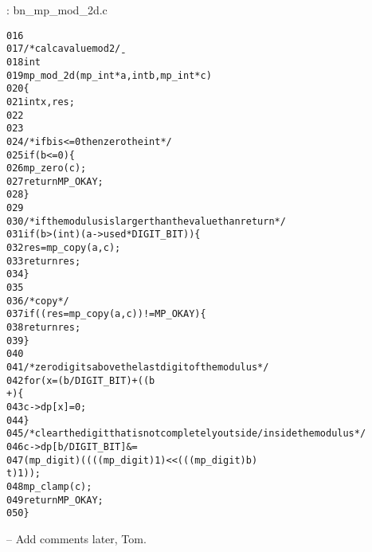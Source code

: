 \documentclass[b5paper]{book}
\begin{document}
\vspace{+3mm}\begin{small}
\hspace{-5.1mm}{\bf File}: bn\_mp\_mod\_2d.c
\vspace{-3mm}
\begin{alltt}
016   
017   /* calc a value mod 2\b */
018   int
019   mp_mod_2d (mp_int * a, int b, mp_int * c)
020   \{
021     int     x, res;
022   
023   
024     /* if b is <= 0 then zero the int */
025     if (b <= 0) \{
026       mp_zero (c);
027       return MP_OKAY;
028     \}
029   
030     /* if the modulus is larger than the value than return */
031     if (b > (int) (a->used * DIGIT_BIT)) \{
032       res = mp_copy (a, c);
033       return res;
034     \}
035   
036     /* copy */
037     if ((res = mp_copy (a, c)) != MP_OKAY) \{
038       return res;
039     \}
040   
041     /* zero digits above the last digit of the modulus */
042     for (x = (b / DIGIT_BIT) + ((b % DIGIT_BIT) == 0 ? 0 : 1); x < c->used; x+
      +) \{
043       c->dp[x] = 0;
044     \}
045     /* clear the digit that is not completely outside/inside the modulus */
046     c->dp[b / DIGIT_BIT] &=
047       (mp_digit) ((((mp_digit) 1) << (((mp_digit) b) % DIGIT_BIT)) - ((mp_digi
      t) 1));
048     mp_clamp (c);
049     return MP_OKAY;
050   \}
\end{alltt}
\end{small}

-- Add comments later, Tom.
\end{document}
